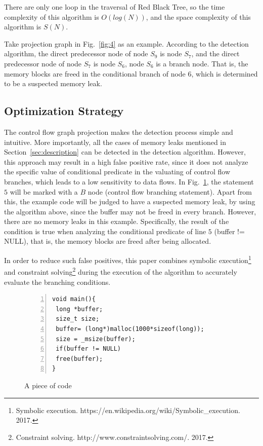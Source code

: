 There are only one loop in the traversal of Red Black Tree, so the time complexity of this algorithm is $O(log(N))$, and the space complexity of this algorithm is $S(N)$.

Take projection graph in Fig.~\ref{fig:4} as an example. According to the detection algorithm, the direct predecessor node of node $S_9$ is node $S_7$, and the direct predecessor node of node $S_7$ is node $S_6$, node $S_6$ is a branch node. That is, the memory blocks are freed in the conditional branch of node $6$, which is determined to be a suspected memory leak.

\subsection{Optimization Strategy}

The control flow graph projection makes the detection process simple and intuitive. More importantly, all the cases of memory leaks mentioned in Section~\ref{sec:description} can be detected in the detection algorithm. However, this approach may result in a high false positive rate, since it does not analyze the specific value of conditional predicate in the valuating of control flow branches, which leads to a low sensitivity to data flows. In Fig.~\ref{fig:7}, the statement $5$ will be marked with a $B$ node (control flow branching statement). Apart from this, the example code will be judged to have a suspected memory leak, by using the algorithm above, since the buffer may not be freed in every branch. However, there are no memory leaks in this example. Specifically, the result of the condition is true when analyzing the conditional predicate of line $5$ (buffer != NULL), that is, the memory blocks are freed after being allocated. 

In order to reduce such false positives, this paper combines symbolic execution\footnote{Symbolic execution. https://en.wikipedia.org/wiki/Symbolic\_execution. 2017.} and constraint solving\footnote{Constraint solving. http://www.constraintsolving.com/. 2017.} during the execution of the algorithm to accurately evaluate the branching conditions.
%
\begin{figure}[!h]
\small
\centering
\begin{lstlisting}[frame=single,framexrightmargin=-10pt,numbers=left] 
void main(){
 long *buffer;
 size_t size;
 buffer= (long*)malloc(1000*sizeof(long));
 size = _msize(buffer);
 if(buffer != NULL)
 free(buffer);
}
\end{lstlisting}
\caption{A piece of code}\label{fig:7}
\end{figure}

